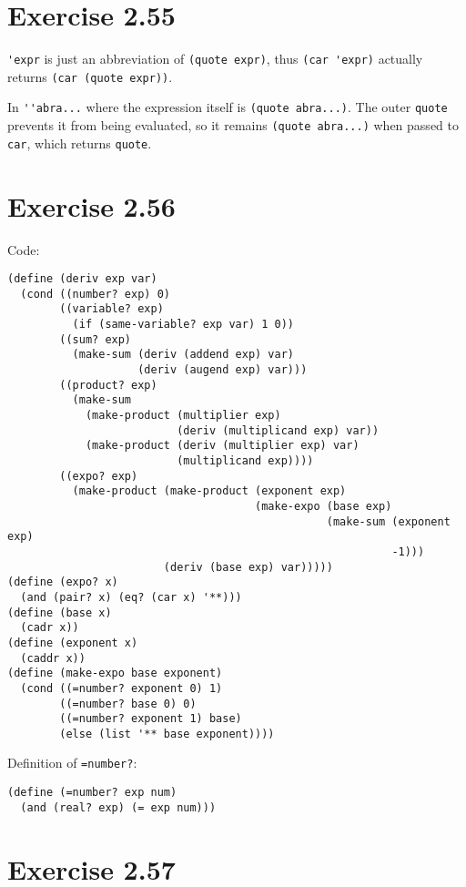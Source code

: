 \documentclass[../main.tex]{subfiles}
\begin{document}
\section{Exercise 2.55}

\lstinline{'expr} is just an abbreviation of
 \lstinline{(quote expr)}, thus \lstinline{(car 'expr)}
 actually returns \lstinline{(car (quote expr))}.

In \lstinline{''abra...} where the expression itself
 is \lstinline{(quote abra...)}. The outer \lstinline{quote}
 prevents it from being evaluated, so it remains
 \lstinline{(quote abra...)} when passed to \lstinline{car},
 which returns \lstinline{quote}.

\section{Exercise 2.56}

Code:

\begin{lstlisting}
(define (deriv exp var)
  (cond ((number? exp) 0)
        ((variable? exp)
          (if (same-variable? exp var) 1 0))
        ((sum? exp)
          (make-sum (deriv (addend exp) var)
                    (deriv (augend exp) var)))
        ((product? exp)
          (make-sum
            (make-product (multiplier exp)
                          (deriv (multiplicand exp) var))
            (make-product (deriv (multiplier exp) var)
                          (multiplicand exp))))
        ((expo? exp)
          (make-product (make-product (exponent exp)
                                      (make-expo (base exp)
                                                 (make-sum (exponent exp)
                                                           -1)))
                        (deriv (base exp) var)))))
(define (expo? x)
  (and (pair? x) (eq? (car x) '**)))
(define (base x)
  (cadr x))
(define (exponent x)
  (caddr x))
(define (make-expo base exponent)
  (cond ((=number? exponent 0) 1)
        ((=number? base 0) 0)
        ((=number? exponent 1) base)
        (else (list '** base exponent))))
\end{lstlisting}

Definition of \lstinline{=number?}:

\begin{lstlisting}
(define (=number? exp num)
  (and (real? exp) (= exp num)))
\end{lstlisting}

\section{Exercise 2.57}
\end{document}
